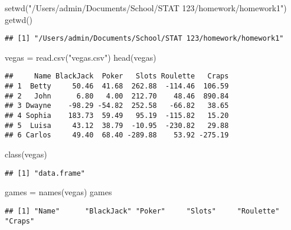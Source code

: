 \documentclass[]{article}
\newenvironment{Shaded}{\begin{snugshade}}{\end{snugshade}}
\newcommand{\FunctionTok}[1]{\textcolor[rgb]{0.00,0.00,0.00}{#1}}
\newcommand{\NormalTok}[1]{#1}
\newcommand{\OtherTok}[1]{\textcolor[rgb]{0.56,0.35,0.01}{#1}}
\newcommand{\StringTok}[1]{\textcolor[rgb]{0.31,0.60,0.02}{#1}}
\begin{document}
\begin{Shaded}
\begin{Highlighting}[]
\FunctionTok{setwd}\NormalTok{(}\StringTok{"/Users/admin/Documents/School/STAT 123/homework/homework1"}\NormalTok{)}
\FunctionTok{getwd}\NormalTok{()}
\end{Highlighting}
\end{Shaded}

\begin{verbatim}
## [1] "/Users/admin/Documents/School/STAT 123/homework/homework1"
\end{verbatim}

\begin{Shaded}
\begin{Highlighting}[]
\NormalTok{vegas }\OtherTok{=} \FunctionTok{read.csv}\NormalTok{(}\StringTok{"vegas.csv"}\NormalTok{)}
\FunctionTok{head}\NormalTok{(vegas)}
\end{Highlighting}
\end{Shaded}

\begin{verbatim}
##     Name BlackJack  Poker   Slots Roulette   Craps
## 1  Betty     50.46  41.68  262.88  -114.46  106.59
## 2   John      6.80   4.00  212.70    48.46  890.84
## 3 Dwayne    -98.29 -54.82  252.58   -66.82   38.65
## 4 Sophia    183.73  59.49   95.19  -115.82   15.20
## 5  Luisa     43.12  38.79  -10.95  -230.82   29.88
## 6 Carlos     49.40  68.40 -289.88    53.92 -275.19
\end{verbatim}

\begin{Shaded}
\begin{Highlighting}[]
\FunctionTok{class}\NormalTok{(vegas)}
\end{Highlighting}
\end{Shaded}

\begin{verbatim}
## [1] "data.frame"
\end{verbatim}

\begin{Shaded}
\begin{Highlighting}[]
\NormalTok{games }\OtherTok{=} \FunctionTok{names}\NormalTok{(vegas)}
\NormalTok{games}
\end{Highlighting}
\end{Shaded}

\begin{verbatim}
## [1] "Name"      "BlackJack" "Poker"     "Slots"     "Roulette"  "Craps"
\end{verbatim}
\end{document}
